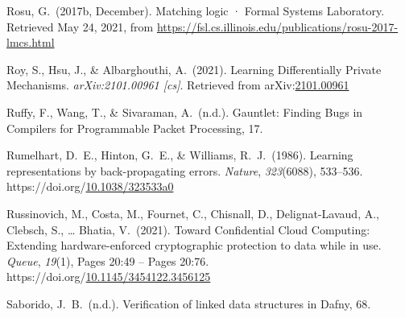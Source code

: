 \documentclass[12pt,twoside]{article}
\begin{document}
{\begin{thebibliography}{1079}
\mdbibitemlabel{}Rosu, G.~(2017b, December). Matching logic · Formal Systems Laboratory. Retrieved May 24, 2021, from \href{https://fsl.cs.illinois.edu/publications/rosu-2017-lmcs.html}{{\ttfamily https://\hspace{0pt}fsl.\hspace{0pt}cs.\hspace{0pt}illinois.\hspace{0pt}edu/\hspace{0pt}publications/\hspace{0pt}rosu-\hspace{0pt}2017-\hspace{0pt}lmcs.\hspace{0pt}html}}%

\mdbibitemlabel{}Roy, S., Hsu, J., \& Albarghouthi, A.~(2021). Learning Differentially Private Mechanisms. \emph{arXiv:2101.00961 {}[cs]}. Retrieved from arXiv:\href{http://arxiv.org/abs/2101.00961}{2101.00961}%

\mdbibitemlabel{}Ruffy, F., Wang, T., \& Sivaraman, A.~(n.d.). Gauntlet: Finding Bugs in Compilers for Programmable Packet Processing, 17.%

\mdbibitemlabel{}Rumelhart, D.~E., Hinton, G.~E., \& Williams, R.~J.~(1986). Learning representations by back-propagating errors. \emph{Nature}, \emph{323}(6088), 533–536. https://doi.org/\href{https://dx.doi.org/10.1038/323533a0}{10.1038/323533a0}%

\mdbibitemlabel{}Russinovich, M., Costa, M., Fournet, C., Chisnall, D., Delignat-Lavaud, A., Clebsch, S., … Bhatia, V.~(2021). Toward Confidential Cloud Computing: Extending hardware-enforced cryptographic protection to data while in use. \emph{Queue}, \emph{19}(1), Pages 20:49 – Pages 20:76. https://doi.org/\href{https://dx.doi.org/10.1145/3454122.3456125}{10.1145/3454122.3456125}%

\mdbibitemlabel{}Saborido, J.~B.~(n.d.). Verification of linked data structures in Dafny, 68.%


\end{thebibliography}}
\end{document}
